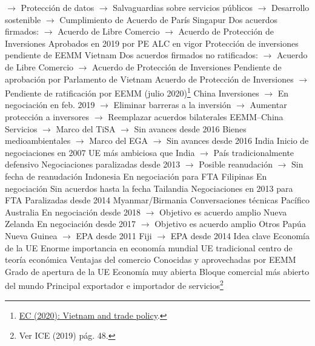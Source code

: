 \documentclass{nuevotema}
\begin{document}
\begin{esquemal}
				\4[] $\to$ Protección de datos
				\4[] $\to$ Salvaguardias sobre servicios públicos
				\4[] $\to$ Desarrollo sostenible
				\4[] $\to$ Cumplimiento de Acuerdo de París
				\4 Singapur
				\4[] Dos acuerdos firmados:
				\4[] $\to$ Acuerdo de Libre Comercio
				\4[] $\to$ Acuerdo de Protección de Inversiones
				\4[] Aprobados en 2019 por PE
				\4[] ALC en vigor
				\4[] Protección de inversiones pendiente de EEMM
				\4 Vietnam
				\4[] Dos acuerdos firmados no ratificados:
				\4[] $\to$ Acuerdo de Libre Comercio
				\4[] $\to$ Acuerdo de Protección de Inversiones
				\4[] Pendiente de aprobación por Parlamento de Vietnam
				\4[] Acuerdo de Protección de Inversiones
				\4[] $\to$ Pendiente de ratificación por EEMM (julio 2020)\footnote{\href{https://ec.europa.eu/trade/policy/countries-and-regions/countries/vietnam/}{EC (2020): Vietnam and trade policy}.}
				\4 China
				\4[] Inversiones
				\4[] $\to$ En negociación en feb. 2019
				\4[] $\to$ Eliminar barreras a la inversión
				\4[] $\to$ Aumentar protección a inversores
				\4[] $\to$ Reemplazar acuerdos bilaterales EEMM--China
				\4[] Servicios
				\4[] $\to$ Marco del TiSA
				\4[] $\to$ Sin avances desde 2016
				\4[] Bienes medioambientales
				\4[] $\to$ Marco del EGA
				\4[] $\to$ Sin avances desde 2016
				\4 India
				\4[] Inicio de negociaciones en 2007
				\4[] UE más ambiciosa que India
				\4[] $\to$ País tradicionalmente defensivo
				\4[] Negociaciones paralizadas desde 2013
				\4[] $\to$ Posible reanudación
				\4[] $\to$ Sin fecha de reanudación
				\4 Indonesia
				\4[] En negociación para FTA
				\4 Filipinas
				\4[] En negociación
				\4[] Sin acuerdos hasta la fecha
				\4 Tailandia
				\4[] Negociaciones en 2013 para FTA
				\4[] Paralizadas desde 2014
				\4 Myanmar/Birmania
				\4[] Conversaciones técnicas
			\3 Pacífico
				\4 Australia
				\4[] En negociación desde 2018
				\4[] $\to$ Objetivo es acuerdo amplio
				\4 Nueva Zelanda
				\4[] En negociación desde 2017
				\4[] $\to$ Objetivo es acuerdo amplio
				\4 Otros
				\4[] Papúa Nueva Guinea
				\4[] $\to$ EPA desde 2011
				\4[] Fiji
				\4[] $\to$ EPA desde 2014
	\1 
		\2 Idea clave
			\3 Economía de la UE
				\4 Enorme importancia en economía mundial
				\4 UE tradicional centro de teoría económica
				\4 Ventajas del comercio
				\4[] Conocidas y aprovechadas por EEMM
				\4 Grado de apertura de la UE
				\4[] Economía muy abierta
				\4[] Bloque comercial más abierto del mundo
				\4 Principal exportador e importador de servicios\footnote{Ver ICE (2019) pág. 48.}

\end{esquemal}
\end{document}
